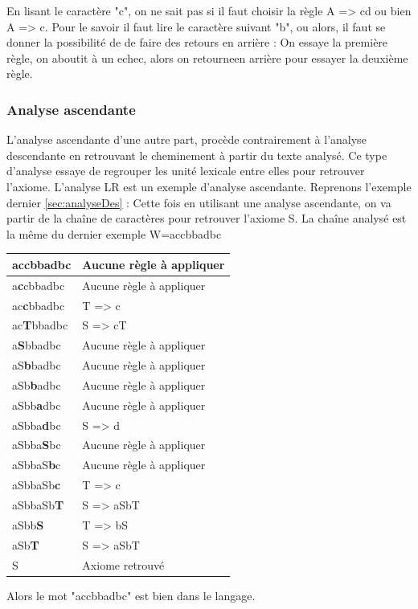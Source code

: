 \documentclass{article}
\begin{document}
En lisant le caractère "c", on ne sait pas si il faut choisir la règle A => cd ou bien A => c.
Pour le savoir il faut lire le caractère suivant "b", ou alors, il faut se donner la possibilité de de faire des retours en arrière :
On essaye la première règle, on aboutit à un echec, alors on retourneen arrière pour essayer la deuxième règle.

\subsubsection{Analyse ascendante}
L’analyse ascendante d’une autre part, procède contrairement à l’analyse descendante en retrouvant le cheminement à partir du texte analysé. Ce type d’analyse essaye de regrouper les unité lexicale entre elles pour retrouver l’axiome. L’analyse LR est un exemple d’analyse ascendante.
Reprenons l'exemple dernier \ref{sec:analyseDes} :
Cette fois en utilisant une analyse ascendante, on va partir de la chaîne de caractères pour retrouver l'axiome S.
La chaîne analysé est la même du dernier exemple \newline W=accbbadbc\newline\newline\newline
\begin{tabular}{|l|l|}
\hline
\textbf{a}ccbbadbc & Aucune règle à appliquer\\
\hline
a\textbf{c}cbbadbc & Aucune règle à appliquer\\
\hline
ac\textbf{c}bbadbc & T => c\\
\hline
ac\textbf{T}bbadbc & S => cT\\
\hline
a\textbf{S}bbadbc & Aucune règle à appliquer\\
\hline
aS\textbf{b}badbc & Aucune règle à appliquer\\
\hline
aSb\textbf{b}adbc & Aucune règle à appliquer\\
\hline
aSbb\textbf{a}dbc & Aucune règle à appliquer\\
\hline
aSbba\textbf{d}bc & S => d\\
\hline
aSbba\textbf{S}bc & Aucune règle à appliquer\\
\hline
aSbbaS\textbf{b}c & Aucune règle à appliquer\\
\hline
aSbbaSb\textbf{c} & T => c\\
\hline
aSbbaSb\textbf{T} & S => aSbT\\
\hline
aSbb\textbf{S} & T => bS\\
\hline
aSb\textbf{T} & S => aSbT\\
\hline
S & Axiome retrouvé\\
\hline
\end{tabular}
\newline\newline\newline
Alors le mot "accbbadbc" est bien dans le langage.
\end{document}
